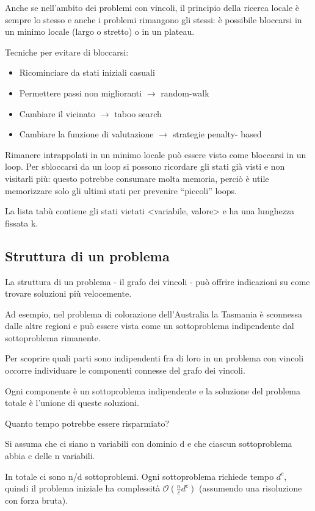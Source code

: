 Anche se nell'ambito dei problemi con vincoli, il principio della ricerca
locale è sempre lo stesso e anche i problemi rimangono gli stessi:
è possibile bloccarsi in un minimo locale (largo o stretto) o in un plateau.

Tecniche per evitare di bloccarsi:

\begin{itemize}
 \item Ricominciare da stati iniziali casuali
 \item Permettere passi non miglioranti $\rightarrow$ random-walk
 \item Cambiare il vicinato $\rightarrow$ taboo search
 \item Cambiare la funzione di valutazione $\rightarrow$ strategie penalty-
based
\end{itemize}

Rimanere intrappolati in un minimo locale può essere visto come bloccarsi
in un loop. Per sbloccarsi da un loop si possono ricordare gli stati
già visti e non visitarli più: questo potrebbe consumare molta memoria,
perciò è utile memorizzare solo gli ultimi stati per prevenire ``piccoli''
loops.

La lista tabù contiene gli stati vietati <variabile, valore> e ha una lunghezza
fissata k.

\subsection{Struttura di un problema}

La struttura di un problema - il grafo dei vincoli - può offrire indicazioni su
come trovare soluzioni più velocemente.

Ad esempio, nel problema di colorazione dell'Australia la Tasmania è sconnessa
dalle altre regioni e può essere vista come un sottoproblema indipendente dal
sottoproblema rimanente.

Per scoprire quali parti sono indipendenti fra di loro in un problema con
vincoli occorre individuare le componenti connesse del grafo dei vincoli.

Ogni componente è un sottoproblema indipendente e la soluzione del problema
totale è l'unione di queste soluzioni.

Quanto tempo potrebbe essere risparmiato?

Si assuma che ci siano n variabili con dominio d e che ciascun sottoproblema
abbia c delle n variabili.

In totale ci sono n/d sottoproblemi. Ogni sottoproblema richiede tempo $d^c$,
quindi il problema iniziale ha complessità $\mathcal{O}(\frac{n}{c} d^c)$
(assumendo una risoluzione con forza bruta).

